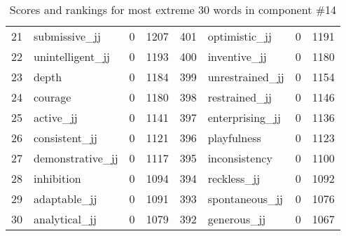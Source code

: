 \begin{table}[tbp]
\begin{tabular}{| rlr@{.}l | rlr@{.}l |}
    21 & submissive\_jj & 0 & 1207    &    401 & optimistic\_jj & 0 & 1191 \\
    22 & unintelligent\_jj & 0 & 1193    &    400 & inventive\_jj & 0 & 1180 \\
    23 & depth & 0 & 1184    &    399 & unrestrained\_jj & 0 & 1154 \\
    24 & courage & 0 & 1180    &    398 & restrained\_jj & 0 & 1146 \\
    25 & active\_jj & 0 & 1141    &    397 & enterprising\_jj & 0 & 1136 \\
    26 & consistent\_jj & 0 & 1121    &    396 & playfulness & 0 & 1123 \\
    27 & demonstrative\_jj & 0 & 1117    &    395 & inconsistency & 0 & 1100 \\
    28 & inhibition & 0 & 1094    &    394 & reckless\_jj & 0 & 1092 \\
    29 & adaptable\_jj & 0 & 1091    &    393 & spontaneous\_jj & 0 & 1076 \\
    30 & analytical\_jj & 0 & 1079    &    392 & generous\_jj & 0 & 1067 \\
    \hline
    \end{tabular}
    \caption{Scores and rankings for most extreme 30 words in component \#14} 
\end{table}
\clearpage
